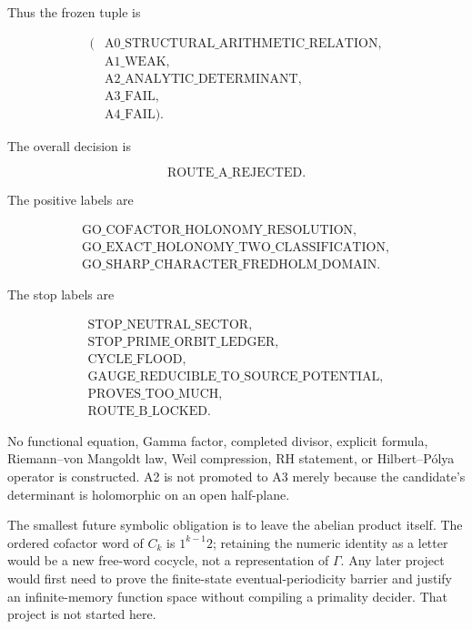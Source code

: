 Thus the frozen tuple is

\begin{equation}
\boxed{\begin{aligned}
(&\mathrm{A0\_STRUCTURAL\_ARITHMETIC\_RELATION},\\
 &\mathrm{A1\_WEAK},\\
 &\mathrm{A2\_ANALYTIC\_DETERMINANT},\\
 &\mathrm{A3\_FAIL},\\
 &\mathrm{A4\_FAIL}).
\end{aligned}}
\label{eq:route-tuple}
\end{equation}

The overall decision is

\[
 \boxed{\mathrm{ROUTE\_A\_REJECTED}}.
\]

The positive labels are

\[
\begin{gathered}
 \mathrm{GO\_COFACTOR\_HOLONOMY\_RESOLUTION},\\
 \mathrm{GO\_EXACT\_HOLONOMY\_TWO\_CLASSIFICATION},\\
 \mathrm{GO\_SHARP\_CHARACTER\_FREDHOLM\_DOMAIN}.
\end{gathered}
\]

The stop labels are

\[
\begin{gathered}
 \mathrm{STOP\_NEUTRAL\_SECTOR},\\
 \mathrm{STOP\_PRIME\_ORBIT\_LEDGER},\\
 \mathrm{CYCLE\_FLOOD},\\
 \mathrm{GAUGE\_REDUCIBLE\_TO\_SOURCE\_POTENTIAL},\\
 \mathrm{PROVES\_TOO\_MUCH},\\
 \mathrm{ROUTE\_B\_LOCKED}.
\end{gathered}
\]

No functional equation, Gamma factor, completed divisor, explicit formula,
Riemann--von Mangoldt law, Weil compression, RH statement, or Hilbert--Pólya
operator is constructed.  A2 is not promoted to A3 merely because the
candidate's determinant is holomorphic on an open half-plane.

The smallest future symbolic obligation is to leave the abelian product
itself.  The ordered cofactor word of \(C_k\) is \(1^{k-1}2\); retaining the
numeric identity as a letter would be a new free-word cocycle, not a
representation of \(\Gamma\).  Any later project would first need to prove the
finite-state eventual-periodicity barrier and justify an infinite-memory
function space without compiling a primality decider.  That project is not
started here.
